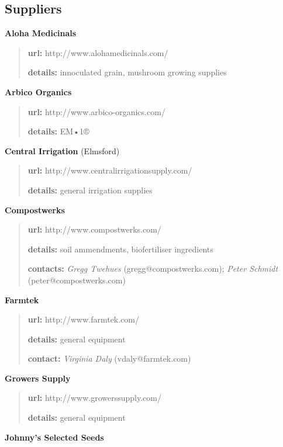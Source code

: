 \subsection{Suppliers}\label{suppliers}

\textbf{Aloha Medicinals}

\begin{quote}
\textbf{url:} http://www.alohamedicinals.com/

\textbf{details:} innoculated grain, mushroom growing supplies
\end{quote}

\textbf{Arbico Organics}

\begin{quote}
\textbf{url:} http://www.arbico-organics.com/

\textbf{details:} EM•1®
\end{quote}

\textbf{Central Irrigation} (Elmsford)

\begin{quote}
\textbf{url:} http://www.centralirrigationsupply.com/

\textbf{details:} general irrigation supplies
\end{quote}

\textbf{Compostwerks}

\begin{quote}
\textbf{url:} http://www.compostwerks.com/

\textbf{details:} soil ammendments, biofertiliser ingredients

\textbf{contacts:} \emph{Gregg Twehues} (gregg@compostwerks.com);
\emph{Peter Schmidt} (peter@compostwerks.com)
\end{quote}

\textbf{Farmtek}

\begin{quote}
\textbf{url:} http://www.farmtek.com/

\textbf{details:} general equipment

\textbf{contact:} \emph{Virginia Daly} (vdaly@farmtek.com)
\end{quote}

\textbf{Growers Supply}

\begin{quote}
\textbf{url:} http://www.growerssupply.com/

\textbf{details:} general equipment
\end{quote}

\textbf{Johnny's Selected Seeds}

